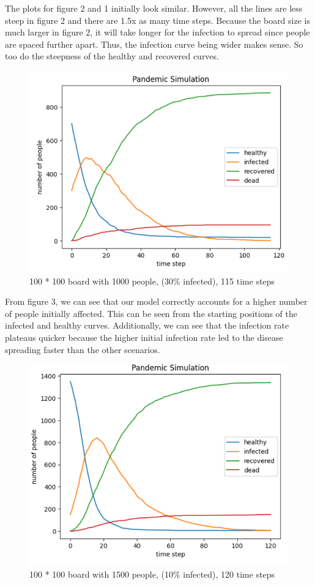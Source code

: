 \documentclass{article}
\begin{document}
The plots for figure 2 and 1 initially look similar. However, all the lines are less steep in figure 2 and there are 1.5x as many time steps. Because the board size is much larger in figure 2, it will take longer for the infection to spread since people are spaced further apart. Thus, the infection curve being wider makes sense. So too do the steepness of the healthy and recovered curves. \\
\begin{figure}[H]
    \centering
    \includegraphics[width=.6\linewidth]{situation3.PNG}
    \caption{100 * 100 board with 1000 people, (30\% infected), 115 time steps}
    \label{fig:enter-label}
\end{figure}
From figure 3, we can see that our model correctly accounts for a higher number of people initially affected. This can be seen from the starting positions of the infected and healthy curves. Additionally, we can see that the infection rate plateaus quicker because the higher initial infection rate led to the disease spreading faster than the other scenarios. \\
\begin{figure}[H]
    \centering
    \includegraphics[width=.6\linewidth]{situation4.PNG}
    \caption{100 * 100 board with 1500 people, (10\% infected), 120 time steps}
    \label{fig:enter-label}
\end{figure}
\end{document}
